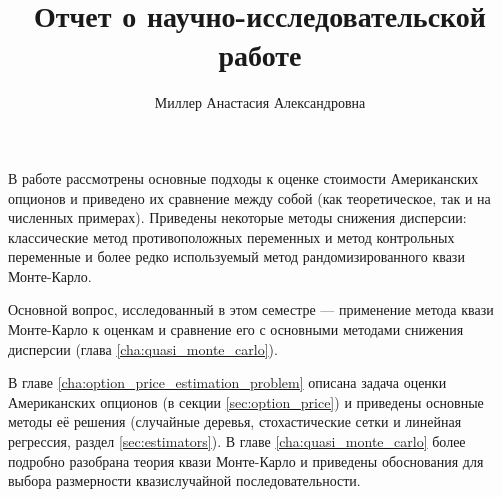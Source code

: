 \documentclass[specialist,
               substylefile = ../spbu.rtx,
               subf,href,colorlinks=true, 12pt]{disser}
\begin{document}
%
%


\title{Отчет о научно-исследовательской работе}


\author{Миллер Анастасия Александровна}


\date{\number\year}

\begin{large}
\maketitle
\end{large}

\tableofcontents

\intro
В работе рассмотрены основные подходы к оценке стоимости Американских опционов и приведено их сравнение между собой (как теоретическое, так и на численных примерах). Приведены некоторые методы снижения дисперсии: классические метод противоположных переменных и метод контрольных переменные и более редко используемый метод рандомизированного квази Монте-Карло.

Основной вопрос, исследованный в этом семестре --- применение метода квази Монте-Карло к оценкам и сравнение его с основными методами снижения дисперсии (глава \ref{cha:quasi_monte_carlo}).

В главе \ref{cha:option_price_estimation_problem} описана задача оценки Американских опционов (в секции \ref{sec:option_price}) и приведены основные методы её решения (случайные деревья, стохастические сетки и линейная регрессия, раздел \ref{sec:estimators}). 
В главе \ref{cha:quasi_monte_carlo} более подробно разобрана теория квази Монте-Карло и приведены обоснования для выбора размерности квазислучайной последовательности. %
\end{document}
